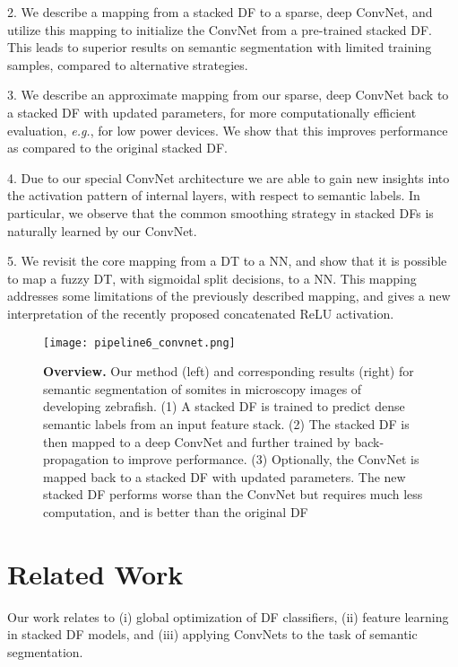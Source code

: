\documentclass[twocolumn]{svjour3}
\begin{document}
2.		   We describe a mapping from a stacked DF to a sparse, deep ConvNet, and utilize this mapping to initialize the ConvNet from a pre-trained stacked DF. This leads to superior results on semantic segmentation with limited training samples, compared to alternative strategies.
 
3.         We describe an approximate mapping from our sparse, deep ConvNet back to a stacked DF with updated parameters, for more computationally efficient evaluation, \textit{e.g.}, for low power devices. We show that this improves performance as compared to the original stacked DF.
 
4.         Due to our special ConvNet architecture we are able to gain new insights into the activation pattern of internal layers, with respect to semantic labels. In particular, we observe that the common smoothing strategy in stacked DFs is naturally learned by our ConvNet.

5.		   We revisit the core mapping from a DT to a NN, and show that it is possible to map a fuzzy DT, with sigmoidal split decisions, to a NN.  This mapping addresses some limitations of the previously described mapping, and gives a new interpretation of the recently proposed concatenated ReLU activation.

\begin{figure*}
\begin{center}
   \texttt{[image: pipeline6\_convnet.png]}
\end{center}
   \caption{\textbf{Overview.} Our method (left) and corresponding results (right) for semantic segmentation of somites in microscopy images of developing zebrafish. (1) A stacked DF is trained to predict dense semantic labels from an input feature stack. (2) The stacked DF is then mapped to a deep ConvNet and further trained by back-propagation to improve performance. (3) Optionally, the ConvNet is mapped back to a stacked DF with updated parameters. The new stacked DF performs worse than the ConvNet but requires much less computation, and is better than the original DF}
\label{fig:pipeline}
\end{figure*}

\section{Related Work}

Our work relates to (i) global optimization of DF classifiers, (ii) feature learning in stacked DF models, and (iii) applying ConvNets to the task of semantic segmentation.
\end{document}

